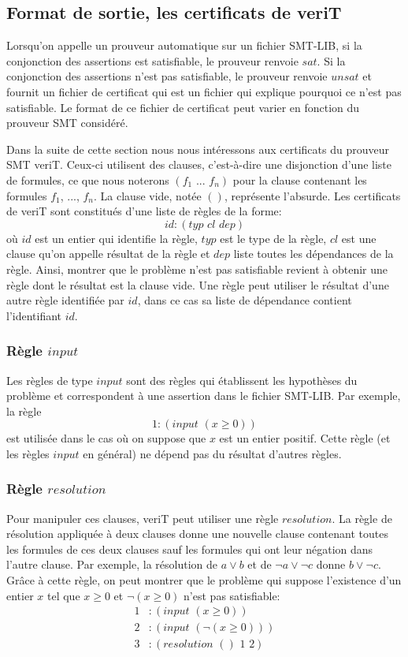 \documentclass[11pt]{article}
\begin{document}
\subsection{Format de sortie, les certificats de veriT} \label{sortie}

Lorsqu'on appelle un prouveur automatique sur un fichier SMT-LIB, si la conjonction des assertions est satisfiable, le prouveur renvoie $sat$. Si la conjonction des assertions n'est pas satisfiable, le prouveur renvoie $unsat$ et fournit un fichier de certificat qui est un fichier qui explique pourquoi ce n'est pas satisfiable. Le format de ce fichier de certificat peut varier en fonction du prouveur SMT considéré. \medbreak

Dans la suite de cette section nous nous intéressons aux certificats du prouveur SMT veriT. Ceux-ci utilisent des clauses, c'est-à-dire une disjonction d'une liste de formules, ce que nous noterons $(f_1 \,\,  ... \,\, f_n)$ pour la clause contenant les formules $f_1$, ..., $f_n$. La clause vide, notée $()$, représente l'absurde. Les certificats de veriT sont constitués d'une liste de règles de la forme: 
\[id:(typ \,\, cl \,\, dep)\] 
où $id$ est un entier qui identifie la règle, $typ$ est le type de la règle, $cl$ est une clause qu'on appelle résultat de la règle et $dep$ liste toutes les dépendances de la règle.  Ainsi, montrer que le problème n'est pas satisfiable revient à obtenir une règle dont le résultat est la clause vide. Une règle peut utiliser le résultat d'une autre règle identifiée par $id$, dans ce cas sa liste de dépendance contient l'identifiant $id$.

\subsubsection{Règle $input$}

Les règles de type $input$ sont des règles qui établissent les hypothèses du problème et correspondent à une assertion dans le fichier SMT-LIB. Par exemple, la règle 
\[ 1:(input \,\, (x \geq 0)) \]
est utilisée dans le cas où on suppose que $x$ est un entier positif. Cette règle (et les règles $input$ en général) ne dépend pas du résultat d'autres règles.\medbreak

\subsubsection{Règle $resolution$}

Pour manipuler ces clauses, veriT peut utiliser une règle $resolution$. La règle de résolution appliquée à deux clauses donne une nouvelle clause contenant toutes les formules de ces deux clauses sauf les formules qui ont leur négation dans l'autre clause. Par exemple, la résolution de $a \vee b$ et de $\neg a \vee \neg c$ donne $b \vee \neg c$. Grâce à cette règle, on peut montrer que le problème qui suppose l'existence d'un entier $x$ tel que $x \geq 0$ et $\neg (x \geq 0)$ n'est pas satisfiable: 
\begin{align*}
1&:(input \,\, ( x \geq 0)) \\
2&:(input \,\, (\neg (x \geq 0))) \\
3&:(resolution \,\,() \,\,1\,\, 2)
\end{align*}
\end{document}

